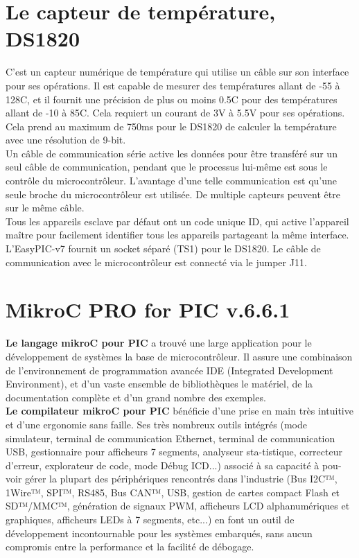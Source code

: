 \documentclass[a4paper, 12pt]{book}
\newcounter{program}[subsection]
\begin{document}
\chapter{Le capteur de température, DS1820}
C’est un capteur numérique de température qui utilise un câble sur son interface pour ses opérations. Il est capable de mesurer des températures allant de -55 à 128C, et il fournit une précision de plus ou moins 0.5C pour des températures allant de -10 à 85C. Cela requiert un courant de 3V à 5.5V pour ses opérations. Cela prend au maximum de 750ms pour le DS1820 de calculer la température avec une résolution de 9-bit.\\
Un câble de communication série active les données pour être transféré sur un seul câble de communication, pendant que le processus lui-même est sous le contrôle du microcontrôleur. L’avantage d’une telle communication est qu’une seule broche du microcontrôleur est utilisée. De multiple capteurs peuvent être sur le même câble.\\
Tous les appareils esclave par défaut ont un code unique ID, qui active l’appareil maître pour facilement identifier tous les appareils partageant la même interface. L’EasyPIC-v7 fournit un socket séparé (TS1) pour le DS1820. Le câble de communication avec le microcontrôleur est connecté via le jumper J11.

\chapter{MikroC PRO for PIC v.6.6.1}
\textbf {Le langage mikroC pour PIC} a trouvé une large application pour le développement de systèmes la base de microcontrôleur. Il assure une combinaison de l'environnement de programmation avancée IDE (Integrated Development Environment), et d’un vaste ensemble de bibliothèques le matériel, de la documentation complète et d’un grand nombre des exemples.\\

\textbf {Le compilateur mikroC pour PIC} bénéficie d'une prise en main très intuitive et d'une ergonomie sans faille. Ses très nombreux outils intégrés (mode simulateur, terminal de communication Ethernet, terminal de communication USB, gestionnaire pour afficheurs 7 segments, analyseur sta-tistique, correcteur d'erreur, explorateur de code, mode Débug ICD...) associé à sa capacité à pou-voir gérer la plupart des périphériques rencontrés dans l'industrie (Bus I2C™, 1Wire™, 
SPI™, RS485, Bus CAN™, USB, gestion de cartes compact Flash et SD™/MMC™, génération de signaux PWM, afficheurs LCD alphanumériques et graphiques, afficheurs LEDs à 7 segments, etc...) en font un outil de développement incontournable pour les systèmes embarqués, sans aucun compromis entre la performance et la facilité de débogage.\\
\end{document}
